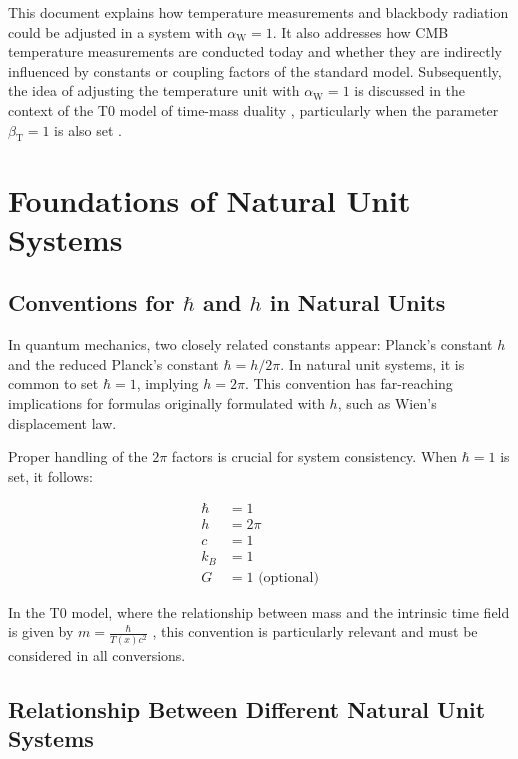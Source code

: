 \documentclass[12pt,a4paper]{article}
\newcommand{\Tfield}{T(x)}
\newcommand{\betaT}{\beta_{\text{T}}}
\newcommand{\alphaW}{\alpha_{\text{W}}}
\begin{document}
	This document explains how temperature measurements and blackbody radiation could be adjusted in a system with \(\alphaW = 1\). It also addresses how CMB temperature measurements are conducted today and whether they are indirectly influenced by constants or coupling factors of the standard model. Subsequently, the idea of adjusting the temperature unit with \(\alphaW = 1\) is discussed in the context of the T0 model of time-mass duality \cite{pascher_galaxies_2025}, particularly when the parameter \(\betaT = 1\) is also set \cite{pascher_params_2025}.
	
	\section{Foundations of Natural Unit Systems}
	
	\subsection{Conventions for \(\hbar\) and \(h\) in Natural Units}
	
	In quantum mechanics, two closely related constants appear: Planck's constant \(h\) and the reduced Planck's constant \(\hbar = h/2\pi\). In natural unit systems, it is common to set \(\hbar = 1\), implying \(h = 2\pi\). This convention has far-reaching implications for formulas originally formulated with \(h\), such as Wien's displacement law.
	
	Proper handling of the \(2\pi\) factors is crucial for system consistency. When \(\hbar = 1\) is set, it follows:
	
	\begin{tcolorbox}[colback=blue!5!white,colframe=blue!75!black,title=Conventions in Natural Units]
		\begin{align}
			\hbar &= 1 \\
			h &= 2\pi \\
			c &= 1 \\
			k_B &= 1 \\
			G &= 1 \text{ (optional)}
		\end{align}
	\end{tcolorbox}
	
	In the T0 model, where the relationship between mass and the intrinsic time field is given by \(m = \frac{\hbar}{\Tfield c^2}\) \cite{pascher_galaxies_2025}, this convention is particularly relevant and must be considered in all conversions.
	
	\subsection{Relationship Between Different Natural Unit Systems}
	
\end{document}
